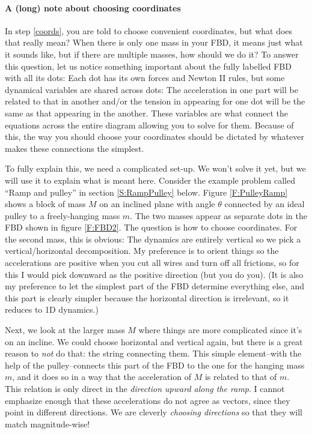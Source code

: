 \paragraph{A (long) note about choosing coordinates} In step \ref{coords}, you are told to choose convenient coordinates, but what does that really mean? When there is only one mass in your FBD, it means just what it sounds like, but if there are multiple masses, how should we do it? To answer this question, let us notice something important about the fully labelled FBD with all its dots: Each dot has its own forces and Newton II rules, but some dynamical variables are shared across dots: The acceleration in one part will be related to that in another and/or the tension in appearing for one dot will be the same as that appearing in the another. 
These variables are what connect the equations across the entire diagram allowing you to solve for them. Because of this, the way you should choose your coordinates should be dictated by whatever makes these connections the simplest. 

To fully explain this, we need a complicated set-up. We won't solve it yet, but we will use it to explain what is meant here. Consider the example problem called “Ramp and pulley” in section \ref{S:RampPulley} below. Figure \ref{F:PulleyRamp} shows a block of mass $M$ on an inclined plane with angle $θ$ connected by an ideal pulley to a freely-hanging mass $m$. The two masses appear as separate dots in the FBD shown in figure \ref{F:FBD2}. The question is how to choose coordinates. For the second mass, this is obvious: The dynamics are entirely vertical so we pick a vertical/horizontal decomposition. My preference is to orient things so the accelerations are positive when you cut all wires and turn off all frictions, so for this I would pick downward as the positive direction (but you do you). (It is also my preference to let the simplest part of the FBD determine everything else, and this part is clearly simpler because the horizontal direction is irrelevant, so it reduces to 1D dynamics.) 

Next, we look at the larger mass $M$ where things are more complicated since it's on an incline. We could choose horizontal and vertical again, but there is a great reason to {\em not} do that: the string connecting them. This simple element--with the help of the pulley--connects this part of the FBD to the one for the hanging mass $m$, and it does so in a way that the acceleration of $M$ is related to that of $m$. This relation is only direct in the {\em direction upward along the ramp}. I cannot emphasize enough that these accelerations do not agree as vectors, since they point in different directions. We are cleverly {\em choosing directions} so that they will match magnitude-wise!

